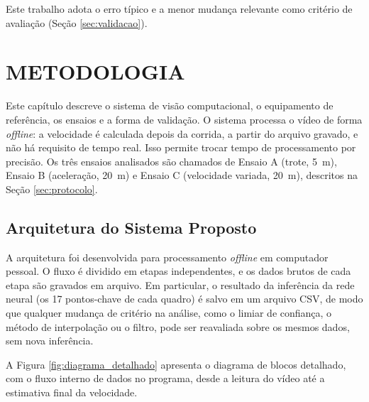 \documentclass[
    12pt,               %
    openright,          %
    twoside,            %
    a4paper,            %
    chapter=TITLE,      %
    english,            %
    brazil              %
    ]{abntex2}
\begin{document}
Este trabalho adota o erro típico e a menor mudança relevante como critério de avaliação (Seção \ref{sec:validacao}).

\chapter{METODOLOGIA}

Este capítulo descreve o sistema de visão computacional, o equipamento de referência, os ensaios e a forma de validação. O sistema processa o vídeo de forma \textit{offline}: a velocidade é calculada depois da corrida, a partir do arquivo gravado, e não há requisito de tempo real. Isso permite trocar tempo de processamento por precisão. Os três ensaios analisados são chamados de Ensaio A (trote, 5~m), Ensaio B (aceleração, 20~m) e Ensaio C (velocidade variada, 20~m), descritos na Seção \ref{sec:protocolo}.

\section{Arquitetura do Sistema Proposto}

A arquitetura foi desenvolvida para processamento \textit{offline} em computador pessoal. O fluxo é dividido em etapas independentes, e os dados brutos de cada etapa são gravados em arquivo. Em particular, o resultado da inferência da rede neural (os 17 pontos-chave de cada quadro) é salvo em um arquivo CSV, de modo que qualquer mudança de critério na análise, como o limiar de confiança, o método de interpolação ou o filtro, pode ser reavaliada sobre os mesmos dados, sem nova inferência.

A Figura \ref{fig:diagrama_detalhado} apresenta o diagrama de blocos detalhado, com o fluxo interno de dados no programa, desde a leitura do vídeo até a estimativa final da velocidade.
\end{document}
